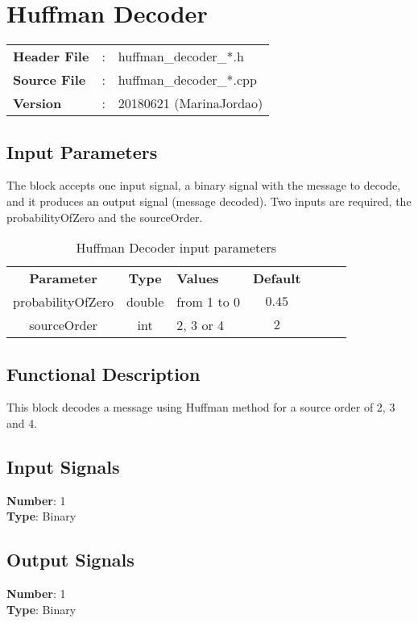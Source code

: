 \clearpage

\section{Huffman Decoder}

\begin{tcolorbox}	
\begin{tabular}{p{2.75cm} p{0.2cm} p{10.5cm}} 	
\textbf{Header File}   &:& huffman\_decoder\_*.h \\
\textbf{Source File}   &:& huffman\_decoder\_*.cpp \\
\textbf{Version}       &:& 20180621 (MarinaJordao)
\end{tabular}
\end{tcolorbox}

\subsection*{Input Parameters}

The block accepts one input signal, a binary signal with the message to decode, and it produces an output signal (message decoded).
Two inputs are required, the probabilityOfZero and the sourceOrder.
\begin{table}[h]
	\centering
	\begin{tabular}{|c|c|p{60mm}|c|ccp{60mm}}
		\cline{1-4}
		\textbf{Parameter} & \textbf{Type} & \textbf{Values} &   \textbf{Default}& \\ \cline{1-4}
		probabilityOfZero & double & from 1 to 0 & $0.45$ \\ \cline{1-4}
		sourceOrder & int & 2, 3 or 4 & $2$ \\ \cline{1-4}
	\end{tabular}
	\caption{Huffman Decoder input parameters}
	\label{table:sink_in_par}
\end{table}

\subsection*{Functional Description}


This block decodes a message using Huffman method for a source order of 2, 3 and 4. 


\subsection*{Input Signals}

\textbf{Number}: 1\\
\textbf{Type}: Binary 

\subsection*{Output Signals}

\textbf{Number}: 1\\
\textbf{Type}: Binary 
%
